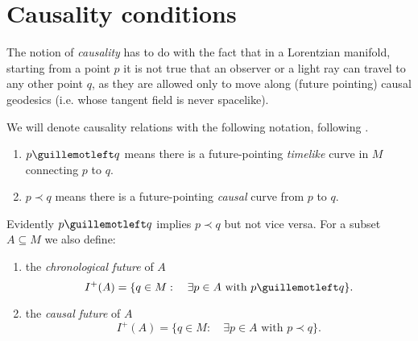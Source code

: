 \section{Causality conditions}

The notion of \emph{causality} has to do with the fact that in a Lorentzian manifold, starting from a  point \(p\) it is not true that an observer or a light ray can travel to any other point \(q\), as they are allowed only to move along (future pointing) causal geodesics (i.e. whose tangent field is never spacelike).


We will denote causality relations with the following notation, following \cite{o1983semi}.
\begin{enumerate}
	\item  \(p \guillemotleft q\) means there is a future-pointing \emph{timelike} curve in \(M\) connecting \(p\) to \(q\).
	\item \(p \prec q\) means there is a future-pointing \emph{causal} curve from \(p\) to \(q\).
\end{enumerate}

Evidently \(p\guillemotleft q\) implies \(p\prec q\) but not vice versa. For a subset \(A \subseteq M\) we also define:
\begin{enumerate}
	\item the \emph{chronological future} of \(A\)
	\[
	I^+(A) =\{ q\in M :\quad\exists p \in A\text{ with } p\guillemotleft q\}.
	\]
	\item the \emph{causal future} of \(A\)
	\[
	I^+(A) =\{ q\in M : \quad\exists p \in A\text{ with } p\prec q\}.
	\]
\end{enumerate}
